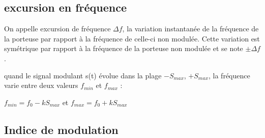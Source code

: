 \documentclass[12pt,a4paper,hidelinks,oneside]{book}
\begin{document}
\subsection{excursion en fréquence}
On appelle excursion de fréquence $\Delta f$, la variation instantanée de la fréquence de la porteuse par rapport à la fréquence de celle-ci non modulée. Cette variation est symétrique par rapport à la fréquence de la porteuse non modulée et se note $\pm \Delta f$.

quand le signal modulant s(t) évolue dans la plage $-{S_{max}}$, $+{S_{max}}$, la fréquence varie entre deux valeurs ${f_{min}}$ et ${f_{max}}$ :

${f_{min}}=f_{0}-k{S_{max}}$  et  ${f_{max}}=f_{0}+k{S_{max}}$

\subsection{Indice de modulation}
\end{document}
